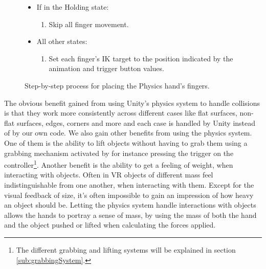 \begin{figure}[H]
\begin{itemize}[noitemsep]
\begin{enumerate}[noitemsep]
\item Get the position that each finger would have according the the animation and trigger button value.
\item Find an intermediate position for the fingers slerping\footnote{SOMETHING ABOUT SLERPING HERE!} from the saved IK target position towards the animation position.
\item Set the IK target of the finger to the intermediate position found for it.
\end{enumerate}
\item If in the Holding state:
\begin{enumerate}[noitemsep]
\item Skip all finger movement.
\end{enumerate}
\item All other states:
\begin{enumerate}[noitemsep]
\item Set each finger's IK target to the position indicated by the animation and trigger button values.
\end{enumerate}
\end{itemize}
\caption{Step-by-step process for placing the Physics hand's fingers.}
\label{fig:stepByStepPhysicsHandFingers}
\end{figure}

The obvious benefit gained from using Unity's physics system to handle collisions is that they work more consistently across different cases like flat surfaces, non-flat surfaces, edges, corners and more and each case is handled by Unity instead of by our own code. We also gain other benefits from using the physics system. One of them is the ability to lift objects without having to grab them using a grabbing mechanism activated by for instance pressing the trigger on the controller\footnote{The different grabbing and lifting systems will be explained in section \ref{sub:grabbingSystem}.}. Another benefit is the ability to get a feeling of weight, when interacting with objects. Often in VR objects of different mass feel indistinguishable from one another, when interacting with them. Except for the visual feedback of size, it's often impossible to gain an impression of how heavy an object should be. Letting the physics system handle interactions with objects allows the hands to portray a sense of mass, by using the mass of both the hand and the object pushed or lifted when calculating the forces applied.


